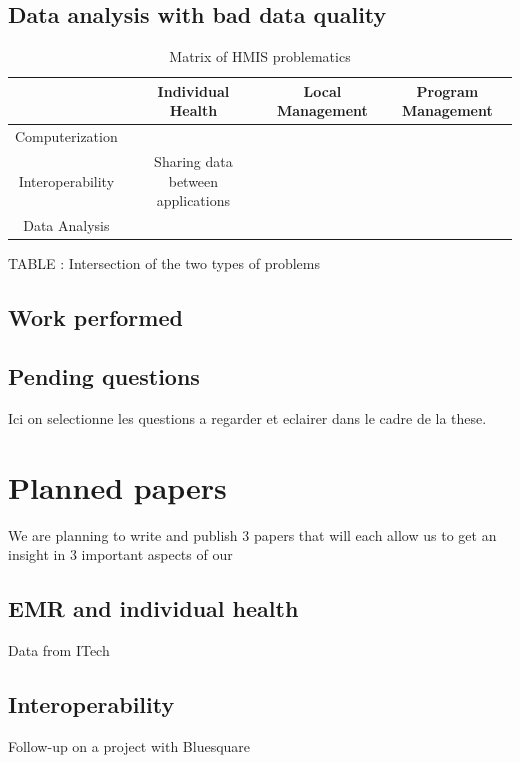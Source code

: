 \documentclass[a4paper,11pt,final,twoside]{article}
\begin{document}
		\subsection{Data analysis with bad data quality}  

\begin{table}[ht]
\begin{tabular}{cccc}
\hline 
 					& Individual Health & Local Management & Program Management \\ 
\hline 
Computerization & & \\
\hline
Interoperability 	& Sharing data between applications  &  &  \\ 
\hline 
Data Analysis &  &  &  \\ 
\hline 
\end{tabular} 
\caption{Matrix of HMIS problematics}
\end{table}

TABLE : Intersection of the two types of problems
	
	\subsection{Work performed}	
	
	\subsection{Pending questions}

Ici on selectionne les questions a regarder et eclairer dans le cadre de la these.

\section{Planned papers}

We are planning to write and publish 3 papers that will each allow us to get an insight in 3 important aspects of our 

	\subsection{EMR and individual health}

Data from ITech

	\subsection{Interoperability }
 
Follow-up on a project with Bluesquare 
 
\end{document}
